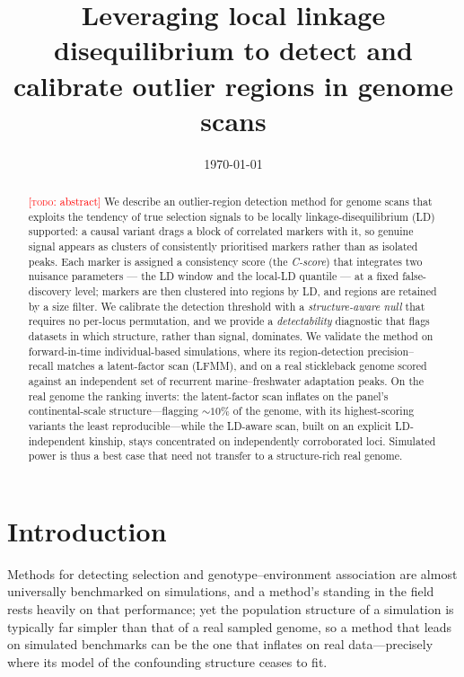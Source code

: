 \documentclass[11pt]{article}
\title{Leveraging local linkage disequilibrium to detect and calibrate
outlier regions in genome scans}
\author{\todo{author list}}
\date{\today}
\newcommand{\todo}[1]{\textcolor{red}{[\textsc{todo}: #1]}}
\begin{document}
\maketitle

\begin{abstract}
\todo{abstract} We describe an outlier-region detection method for genome scans
that exploits the tendency of true selection signals to be locally
linkage-disequilibrium (LD) supported: a causal variant drags a block of
correlated markers with it, so genuine signal appears as clusters of
consistently prioritised markers rather than as isolated peaks. Each marker is
assigned a consistency score (the \emph{C-score}) that integrates two nuisance
parameters --- the LD window and the local-LD quantile --- at a fixed
false-discovery level; markers are then clustered into regions by LD, and
regions are retained by a size filter. We calibrate the detection threshold with
a \emph{structure-aware null} that requires no per-locus permutation, and we
provide a \emph{detectability} diagnostic that flags datasets in which structure,
rather than signal, dominates. We validate the method on forward-in-time individual-based simulations,
where its region-detection precision--recall matches a latent-factor scan (LFMM),
and on a real stickleback genome scored against an independent set of recurrent
marine--freshwater adaptation peaks. On the real genome the ranking inverts: the
latent-factor scan inflates on the panel's continental-scale structure---flagging
${\sim}10\%$ of the genome, with its highest-scoring variants the least
reproducible---while the LD-aware scan, built on an explicit LD-independent kinship,
stays concentrated on independently corroborated loci. Simulated power is thus a best
case that need not transfer to a structure-rich real genome.
\end{abstract}

\section{Introduction}

Methods for detecting selection and genotype--environment association are almost
universally benchmarked on simulations, and a method's standing in the field rests
heavily on that performance; yet the population structure of a simulation is typically
far simpler than that of a real sampled genome, so a method that leads on simulated
benchmarks can be the one that inflates on real data---precisely where its model of the
confounding structure ceases to fit.
\end{document}
